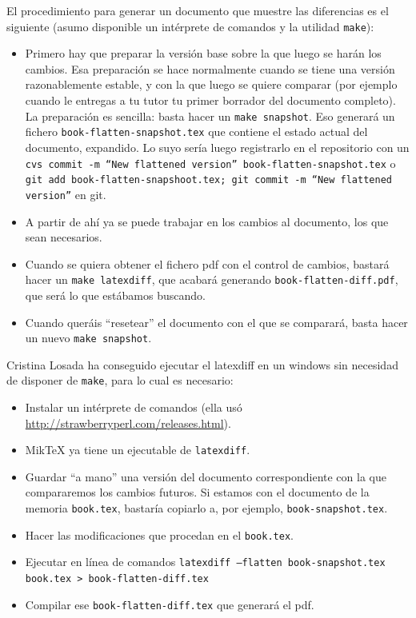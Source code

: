 \documentclass[spanish,openright]{book}
\begin{document}
El procedimiento para generar un documento que muestre las
diferencias es el siguiente (asumo disponible un intérprete de
comandos y la utilidad \texttt{make}):

\begin{itemize}
\item Primero hay que preparar la versión base sobre la que luego se
harán los cambios. Esa preparación se hace normalmente cuando se
tiene una versión razonablemente estable, y con la que luego se
quiere comparar (por ejemplo cuando le entregas a tu tutor tu primer
borrador del documento completo). La preparación es sencilla: basta
hacer un \texttt{make snapshot}. Eso generará un fichero
\texttt{book-flatten-snapshot.tex} que contiene el estado actual del
documento, expandido. Lo suyo sería luego registrarlo en el
repositorio con un \texttt{cvs commit -m ``New flattened version''
book-flatten-snapshot.tex} o \texttt{git add
book-flatten-snapshoot.tex; git commit -m ``New flattened
version''} en git.
\item A partir de ahí ya se puede trabajar en los cambios al documento,
los que sean necesarios.
\item Cuando se quiera obtener el fichero pdf con el control de cambios,
bastará hacer un \texttt{make latexdiff}, que acabará generando
\texttt{book-flatten-diff.pdf}, que será lo que estábamos buscando.

\item Cuando queráis ``resetear'' el documento con el que se comparará,
basta hacer un nuevo \texttt{make snapshot}.
\end{itemize}

Cristina Losada ha conseguido ejecutar el latexdiff en un windows sin
necesidad de disponer de \texttt{make}, para lo cual es necesario:

\begin{itemize}
\item Instalar un intérprete de comandos (ella usó
\url{http://strawberryperl.com/releases.html}).

\item MikTeX ya tiene un ejecutable de \texttt{latexdiff}.

\item Guardar ``a mano'' una versión del documento correspondiente con la
que compararemos los cambios futuros. Si estamos con el documento de la
memoria \texttt{book.tex}, bastaría copiarlo a, por ejemplo,
\texttt{book-snapshot.tex}.

\item Hacer las modificaciones que procedan en el  \texttt{book.tex}.

\item Ejecutar en línea de comandos \texttt{latexdiff --flatten
book-snapshot.tex book.tex > book-flatten-diff.tex}

\item Compilar ese \texttt{book-flatten-diff.tex} que generará el pdf.

\end{itemize}
\end{document}
